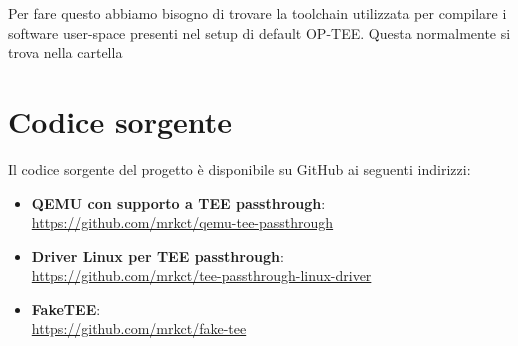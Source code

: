 \documentclass[12pt,italian]{report}
\begin{document}
Per fare questo abbiamo bisogno di trovare la toolchain utilizzata per
compilare i software user-space presenti nel setup di default OP-TEE.
Questa normalmente si trova nella cartella 

\chapter{Codice sorgente}
\label{app:codice-sorgente}
Il codice sorgente del progetto è disponibile su GitHub ai seguenti indirizzi:

\begin{itemize}
    \item 
        \textbf{QEMU con supporto a TEE passthrough}: \\
        \noindent 
        \url{https://github.com/mrkct/qemu-tee-passthrough}
    \item
        \textbf{Driver Linux per TEE passthrough}: \\ 
        \noindent
        \url{https://github.com/mrkct/tee-passthrough-linux-driver}
    \item
        \textbf{FakeTEE}: \\
        \noindent
        \url{https://github.com/mrkct/fake-tee}
\end{itemize}



\end{document}
